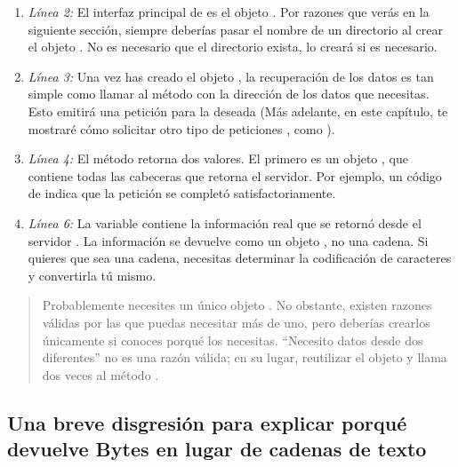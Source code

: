 \begin{enumerate}

\item \emph{Línea 2:} El interfaz principal de  es el objeto . Por razones que verás en la siguiente sección, siempre deberías pasar el nombre de un directorio al crear el objeto . No es necesario que el directorio exista,  lo creará si es necesario.

\item \emph{Línea 3:} Una vez has creado el objeto , la recuperación de los datos es tan simple como llamar al método  con la dirección de los datos que necesitas. Esto emitirá una petición  para la  deseada (Más adelante, en este capítulo, te mostraré cómo solicitar otro tipo de peticiones , como ).

\item \emph{Línea 4:} El método  retorna dos valores. El primero es un objeto , que contiene todas las cabeceras que retorna el servidor. Por ejemplo, un código de   indica que la petición se completó satisfactoriamente.

\item \emph{Línea 6:} La variable  contiene la información real que se retornó desde el servidor . La información se devuelve como un objeto , no una cadena. Si quieres que sea una cadena, necesitas determinar la codificación de caracteres y convertirla tú mismo.

\end{enumerate}

\begin{quote}
Probablemente necesites un único objeto . No obstante, existen razones válidas por las que puedas necesitar más de uno, pero deberías crearlos únicamente si conoces porqué los necesitas. ``Necesito datos desde dos  diferentes'' no es una razón válida; en su lugar, reutilizar el objeto  y llama dos veces al método .
\end{quote}

\subsection{Una breve disgresión para explicar porqué  devuelve Bytes en lugar de cadenas de texto}

